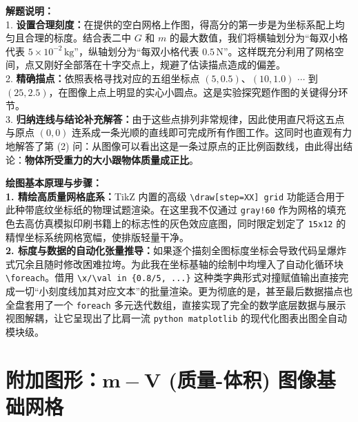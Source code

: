 \vspace{0.6cm}

{\small\color{gray}
\textbf{解题说明：}\\
1. \textbf{设置合理刻度：}在提供的空白网格上作图，得高分的第一步是为坐标系配上均匀且合理的标度。结合表二中 $G$ 和 $m$ 的最大数值，我们将横轴划分为“每双小格代表 $5\times 10^{-2}\,\text{kg}$”，纵轴划分为“每双小格代表 $0.5\,\text{N}$”。这样既充分利用了网格空间，点又刚好全部落在十字交点上，规避了估读描点造成的偏差。\\
2. \textbf{精确描点：}依照表格寻找对应的五组坐标点 $(5, 0.5)、(10, 1.0)$ $\cdots$ 到 $(25, 2.5)$，在图像上点上明显的实心小圆点。这是实验探究题作图的关键得分环节。\\
3. \textbf{归纳连线与结论补充解答：}由于这些点排列非常规律，因此使用直尺将这五点与原点 $(0,0)$ 连系成一条光顺的直线即可完成所有作图工作。这同时也直观有力地解答了第 (2) 问：从图像可以看出这是一条过原点的正比例函数线，由此得出结论：\textbf{物体所受重力的大小跟物体质量成正比}。
}

\vspace{0.6cm}

{\small\color{blue!70!black}
\textbf{绘图基本原理与步骤：}\\
\textbf{1. 精绘高质量网格底系：}TikZ 内置的高级 \texttt{\textbackslash draw[step=XX] grid} 功能适合用于此种带底纹坐标纸的物理试题渲染。在这里我不仅通过 \texttt{gray!60} 作为网格的填充色去高仿真模拟印刷书籍上的标志性的灰色效应底图，同时限定划定了 \texttt{15x12} 的精悍坐标系统网格宽幅，使排版轻量干净。\\
\textbf{2. 标度与数据的自动化张量推导：}如果逐个描刻全图标度坐标会导致代码呈爆炸式冗余且随时修改困难拉垮。为此我在坐标基轴的绘制中均埋入了自动化循环块 \texttt{\textbackslash foreach}。借用 \texttt{\textbackslash x/\textbackslash val in \{0.8/5, ...\}} 这种类字典形式对撞赋值输出直接完成一切“小刻度线加其对应文本”的批量渲染。更为彻底的是，甚至最后数据描点也全盘套用了一个 \texttt{foreach} 多元迭代数组，直接实现了完全的数学底层数据与展示视图解耦，让它呈现出了比肩一流 \texttt{python matplotlib} 的现代化图表出图全自动模块级。
}



\section{附加图形：$\boldsymbol{m-V}$ (质量-体积) 图像基础网格}

\vspace{0.6cm}

